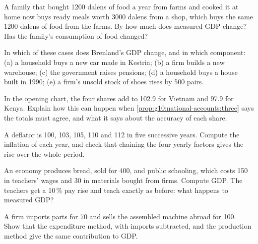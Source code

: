 \begin{exercise}[$\star\star$]\label{exo:g10:national-accounts:10}
A family that bought 1200 dalens of food a year from farms and cooked it at home now buys ready meals worth 3000 dalens from a shop, which buys the same 1200
dalens of food from the farms. By how much does measured GDP change? Has the family's consumption of food changed?
\end{exercise}

\begin{exercise}[$\star\star$]\label{exo:g10:national-accounts:11}
In which of these cases does Brenland's GDP change, and in which component: (a) a household buys a new car made in Kestria; (b) a firm builds a new warehouse; (c)
the government raises pensions; (d) a household buys a house built in 1990; (e) a firm's unsold stock of shoes rises by 500 pairs.
\end{exercise}

\begin{exercise}[$\star\star\star$]\label{exo:g10:national-accounts:12}
In the opening chart, the four shares add to 102.9 for Vietnam and 97.9 for Kenya. Explain how this can happen when \cref{prop:g10:national-accounts:three} says the
totals must agree, and what it says about the accuracy of each share.
\end{exercise}

\begin{exercise}[$\star\star\star$]\label{exo:g10:national-accounts:13}
A deflator is 100, 103, 105, 110 and 112 in five successive years. Compute the inflation of each year, and check that chaining the four yearly factors gives the rise
over the whole period.
\end{exercise}

\begin{exercise}[$\star\star\star$]\label{exo:g10:national-accounts:14}
An economy produces bread, sold for 400, and public schooling, which costs 150 in teachers' wages and 30 in materials bought from firms. Compute GDP. The teachers get a
10\,\% pay rise and teach exactly as before: what happens to measured GDP?
\end{exercise}

\begin{exercise}[$\star\star\star$]\label{exo:g10:national-accounts:15}
A firm imports parts for 70 and sells the assembled machine abroad for 100. Show that the expenditure method, with imports subtracted, and the production method give the
same contribution to GDP.
\end{exercise}

